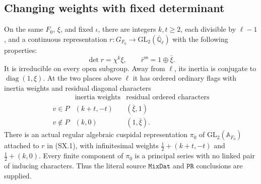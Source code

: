 \subsection{Changing weights with fixed determinant}

\begin{proposition}
\label{claim:SX3}
On the same $F_0$, $\xi$, and fixed $\iota$, there are integers
$k,t\ge2$, each divisible by $\ell-1$, and a continuous
representation $r:G_{F_0}\to\mathrm{GL}_2(\overline{\mathbb Q}_\ell)$
with the following properties:
\[
 \det r=\chi^k\xi,
 \qquad\bar r^{\mathrm{ss}}=1\oplus\bar\xi.         \tag{SX.10}
\]
It is irreducible on every open subgroup.  Away from $\ell$,
its inertia is conjugate to $\operatorname{diag}(1,\xi)$.
At the two places above $\ell$ it has ordered ordinary flags
with inertia weights and residual diagonal characters
\[
 \begin{array}{c|c|c}
    &\text{inertia weights}&\text{residual ordered characters}\\ \hline
   v\in P &(k+t,-t)&(\bar\xi,1)\\
   v\notin P &(k,0)&(1,\bar\xi).
 \end{array}                                                   \tag{SX.11}
\]
There is an actual regular algebraic cuspidal representation
$\pi_0$ of $\mathrm{GL}_2(\mathbb A_{F_0})$ attached to $r$ in
(SX.1), with infinitesimal weights
$\frac12+(k+t,-t)$ and $\frac12+(k,0)$.
Every finite component of $\pi_0$ is a principal series with no
linked pair of inducing characters.  Thus the literal source
$\texttt{MixDat}$ and $\texttt{PR}$ conclusions are supplied.
\end{proposition}
